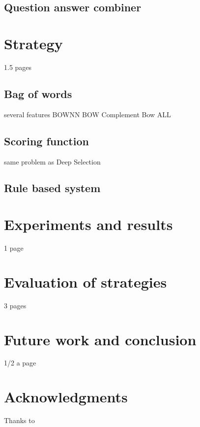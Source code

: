 \documentclass[11pt]{article}
\begin{document}
\subsection{Question answer combiner}

\section{Strategy}
1.5 pages
\subsection{Bag of words}
several features
BOWNN
BOW Complement
Bow ALL

\subsection{Scoring function}
same problem as Deep Selection

\subsection{Rule based system}

\section{Experiments and results}
1 page

\section{Evaluation of strategies}
3 pages

\section{Future work and conclusion}
1/2 a page

\section*{Acknowledgments}
Thanks to



\end{document}
